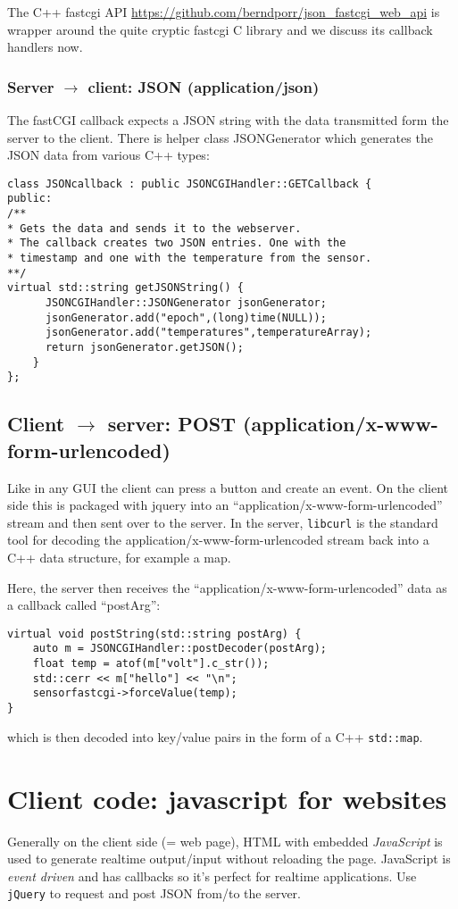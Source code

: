 \documentclass[12pt]{report}
\begin{document}
The C++ fastcgi API \url{https://github.com/berndporr/json_fastcgi_web_api} 
is wrapper around the quite cryptic fastcgi C library and we discuss
its callback handlers now.

\subsubsection{Server $\to$ client: JSON (application/json)}
The fastCGI callback expects a JSON string with the data
transmitted form the server to the client. There is helper
class JSONGenerator which generates the JSON data from various
C++ types:
\begin{verbatim}
class JSONcallback : public JSONCGIHandler::GETCallback {
public:
/**
* Gets the data and sends it to the webserver.
* The callback creates two JSON entries. One with the
* timestamp and one with the temperature from the sensor.
**/
virtual std::string getJSONString() {
      JSONCGIHandler::JSONGenerator jsonGenerator;
      jsonGenerator.add("epoch",(long)time(NULL));
      jsonGenerator.add("temperatures",temperatureArray);
      return jsonGenerator.getJSON();
    }
};
\end{verbatim} 

\subsection{Client $\to$ server: POST (application/x-www-form-urlencoded)}
Like in any GUI the client can press a button and create an event.  On
the client side this is packaged with jquery into an
``application/x-www-form-urlencoded'' stream and then sent over to the
server. In the server, \texttt{libcurl} is the standard tool for decoding
the application/x-www-form-urlencoded stream back into a C++ data
structure, for example a map.

Here, the server then receives the ``application/x-www-form-urlencoded'' data as a callback
called ``postArg'':
\begin{verbatim}
virtual void postString(std::string postArg) {
    auto m = JSONCGIHandler::postDecoder(postArg);
    float temp = atof(m["volt"].c_str());
    std::cerr << m["hello"] << "\n";
    sensorfastcgi->forceValue(temp);
}
\end{verbatim}
which is then decoded into key/value pairs in the form of a C++ \texttt{std::map}.

\section{Client code: javascript for websites}
Generally on the client side (= web page), HTML with embedded
\textsl{JavaScript} is used to generate realtime output/input without
reloading the page. JavaScript is \textsl{event driven} and has
callbacks so it's perfect for realtime applications. Use
\texttt{jQuery} to request and post JSON from/to the server.
\end{document}
